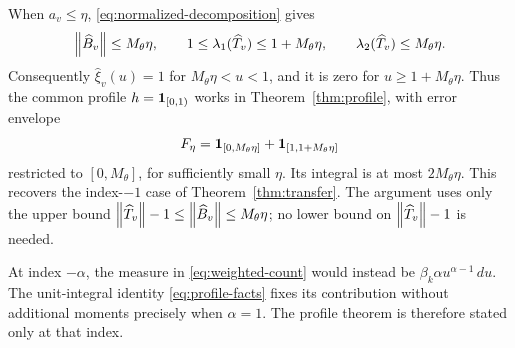 \begin{remark}
When $a_v\le\eta$, \eqref{eq:normalized-decomposition} gives
\[
 \left\lVert \widehat B_v\right\rVert\le M_\theta\eta,\qquad
 1\le\lambda_1(\widehat T_v)\le1+M_\theta\eta,\qquad
 \lambda_2(\widehat T_v)\le M_\theta\eta.
\]
Consequently $\widehat\xi_v(u)=1$ for $M_\theta\eta<u<1$, and it is
zero for $u\ge1+M_\theta\eta$. Thus the common profile
$h=\mathbf 1_{[0,1)}$ works in Theorem~\ref{thm:profile}, with error envelope
\[
 F_\eta=\mathbf 1_{[0,M_\theta\eta]}
          +\mathbf 1_{[1,1+M_\theta\eta]}
\]
restricted to $[0,M_\theta]$, for sufficiently small $\eta$.
Its integral is at most $2M_\theta\eta$.
This recovers the index-$-1$ case of Theorem~\ref{thm:transfer}.
The argument uses only the upper bound
$\left\lVert \widehat T_v\right\rVert-1\le\left\lVert \widehat B_v\right\rVert\le M_\theta\eta$;
no lower bound on $\left\lVert \widehat T_v\right\rVert-1$ is needed.
\end{remark}

\begin{remark}
At index $-\alpha$, the measure in \eqref{eq:weighted-count} would instead
be $\beta_k\alpha u^{\alpha-1}\,du$. The unit-integral identity
\eqref{eq:profile-facts} fixes its contribution without additional moments
precisely when $\alpha=1$. The profile theorem is therefore stated only
at that index.
\end{remark}
